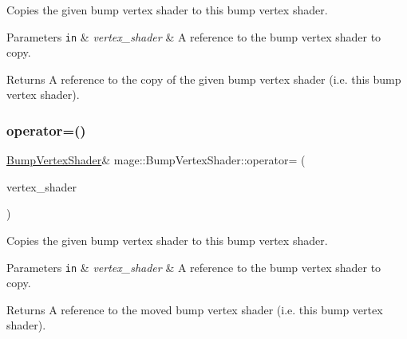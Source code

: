 Copies the given bump vertex shader to this bump vertex shader.


\begin{DoxyParams}[1]{Parameters}
\mbox{\tt in}  & {\em vertex\+\_\+shader} & A reference to the bump vertex shader to copy. \\
\hline
\end{DoxyParams}
\begin{DoxyReturn}{Returns}
A reference to the copy of the given bump vertex shader (i.\+e. this bump vertex shader). 
\end{DoxyReturn}
\hypertarget{classmage_1_1_bump_vertex_shader_a478db6b064206d32b3b92df43a5a4382}{}\label{classmage_1_1_bump_vertex_shader_a478db6b064206d32b3b92df43a5a4382} 
\subsubsection{\texorpdfstring{operator=()}{operator=()}\hspace{0.1cm}{\footnotesize\ttfamily [2/2]}}
{\footnotesize\ttfamily \hyperlink{classmage_1_1_bump_vertex_shader}{Bump\+Vertex\+Shader}\& mage\+::\+Bump\+Vertex\+Shader\+::operator= (\begin{DoxyParamCaption}\item[{\hyperlink{classmage_1_1_bump_vertex_shader}{Bump\+Vertex\+Shader} \&\&}]{vertex\+\_\+shader }\end{DoxyParamCaption})\hspace{0.3cm}{\ttfamily [delete]}}

Copies the given bump vertex shader to this bump vertex shader.


\begin{DoxyParams}[1]{Parameters}
\mbox{\tt in}  & {\em vertex\+\_\+shader} & A reference to the bump vertex shader to copy. \\
\hline
\end{DoxyParams}
\begin{DoxyReturn}{Returns}
A reference to the moved bump vertex shader (i.\+e. this bump vertex shader). 
\end{DoxyReturn}
\hypertarget{classmage_1_1_bump_vertex_shader_a11513b06e76e8d3d55f6d96c5a14bdb7}{}\label{classmage_1_1_bump_vertex_shader_a11513b06e76e8d3d55f6d96c5a14bdb7} 
